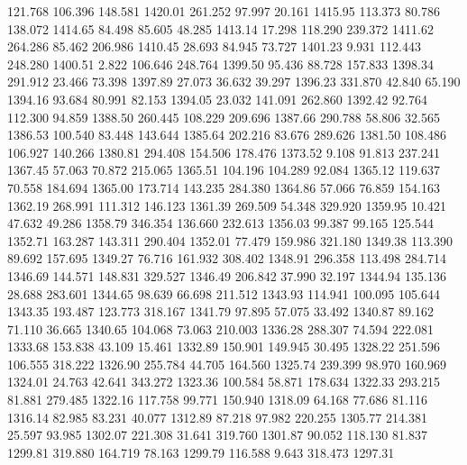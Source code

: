  121.768  106.396  148.581      1420.01
 261.252   97.997   20.161      1415.95
 113.373   80.786  138.072      1414.65
  84.498   85.605   48.285      1413.14
  17.298  118.290  239.372      1411.62
 264.286   85.462  206.986      1410.45
  28.693   84.945   73.727      1401.23
   9.931  112.443  248.280      1400.51
   2.822  106.646  248.764      1399.50
  95.436   88.728  157.833      1398.34
 291.912   23.466   73.398      1397.89
  27.073   36.632   39.297      1396.23
 331.870   42.840   65.190      1394.16
  93.684   80.991   82.153      1394.05
  23.032  141.091  262.860      1392.42
  92.764  112.300   94.859      1388.50
 260.445  108.229  209.696      1387.66
 290.788   58.806   32.565      1386.53
 100.540   83.448  143.644      1385.64
 202.216   83.676  289.626      1381.50
 108.486  106.927  140.266      1380.81
 294.408  154.506  178.476      1373.52
   9.108   91.813  237.241      1367.45
  57.063   70.872  215.065      1365.51
 104.196  104.289   92.084      1365.12
 119.637   70.558  184.694      1365.00
 173.714  143.235  284.380      1364.86
  57.066   76.859  154.163      1362.19
 268.991  111.312  146.123      1361.39
 269.509   54.348  329.920      1359.95
  10.421   47.632   49.286      1358.79
 346.354  136.660  232.613      1356.03
  99.387   99.165  125.544      1352.71
 163.287  143.311  290.404      1352.01
  77.479  159.986  321.180      1349.38
 113.390   89.692  157.695      1349.27
  76.716  161.932  308.402      1348.91
 296.358  113.498  284.714      1346.69
 144.571  148.831  329.527      1346.49
 206.842   37.990   32.197      1344.94
 135.136   28.688  283.601      1344.65
  98.639   66.698  211.512      1343.93
 114.941  100.095  105.644      1343.35
 193.487  123.773  318.167      1341.79
  97.895   57.075   33.492      1340.87
  89.162   71.110   36.665      1340.65
 104.068   73.063  210.003      1336.28
 288.307   74.594  222.081      1333.68
 153.838   43.109   15.461      1332.89
 150.901  149.945   30.495      1328.22
 251.596  106.555  318.222      1326.90
 255.784   44.705  164.560      1325.74
 239.399   98.970  160.969      1324.01
  24.763   42.641  343.272      1323.36
 100.584   58.871  178.634      1322.33
 293.215   81.881  279.485      1322.16
 117.758   99.771  150.940      1318.09
  64.168   77.686   81.116      1316.14
  82.985   83.231   40.077      1312.89
  87.218   97.982  220.255      1305.77
 214.381   25.597   93.985      1302.07
 221.308   31.641  319.760      1301.87
  90.052  118.130   81.837      1299.81
 319.880  164.719   78.163      1299.79
 116.588    9.643  318.473      1297.31
